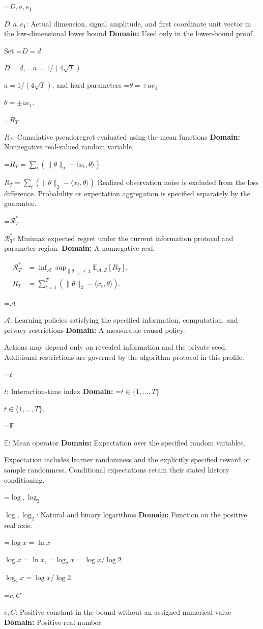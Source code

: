 \documentclass[10pt,a4paper]{article}
\newcommand{\AtlasMath}[1]{\par\begingroup\centering\setbox0=\hbox{$\displaystyle #1$}\ifdim\wd0>1.4\linewidth\typeout{ATLAS WIDE FORMULA: \the\wd0}\fi\ifdim\wd0>\linewidth\resizebox{\linewidth}{!}{\box0}\else\box0\fi\par\endgroup}
\newcommand{\AtlasInlineMath}[1]{\begingroup\setbox0=\hbox{$#1$}\ifdim\wd0>.4\linewidth\endgroup\AtlasMath{#1}\else\endgroup$#1$\fi}
\begin{document}
\AtlasInlineMath{D,a,e_1}: Actual dimension, signal amplitude, and first coordinate unit vector in the low-dimensional lower bound \textbf{Domain:} Used only in the lower-bound proof.

Set \AtlasInlineMath{D=d}, \AtlasInlineMath{a=1/(4\sqrt T)}, and hard parameters \AtlasInlineMath{\theta=\pm ae_1}.

\AtlasInlineMath{R_T}: Cumulative pseudoregret evaluated using the mean functions \textbf{Domain:} Nonnegative real-valued random variable.

\AtlasInlineMath{R_T=\sum_t(\|\theta\|_2-\langle x_t,\theta\rangle)} Realized observation noise is excluded from the loss difference. Probability or expectation aggregation is specified separately by the guarantee.

\AtlasInlineMath{\mathcal R_T^*}: Minimax expected regret under the current information protocol and parameter region. \textbf{Domain:} A nonnegative real.


\AtlasMath{\begin{aligned}\mathcal R_T^*&=\inf_{\mathcal A}\sup_{\|\theta\|_2\le1}\mathbb E_{\mathcal A,Z}[R_T],\\ R_T&=\sum_{t=1}^T(\|\theta\|_2-\langle x_t,\theta\rangle).\end{aligned}}


\AtlasInlineMath{\mathcal A}: Learning policies satisfying the specified information, computation, and privacy restrictions \textbf{Domain:} A measurable causal policy.

Actions may depend only on revealed information and the private seed. Additional restrictions are governed by the algorithm protocol in this profile.

\AtlasInlineMath{t}: Interaction-time index \textbf{Domain:} \AtlasInlineMath{t\in\{1,\ldots,T\}}.

\AtlasInlineMath{\mathbb E}: Mean operator \textbf{Domain:} Expectation over the specified random variables.

Expectation includes learner randomness and the explicitly specified reward or sample randomness. Conditional expectations retain their stated history conditioning.

\AtlasInlineMath{\log,\log_2}: Natural and binary logarithms \textbf{Domain:} Function on the positive real axis.

\AtlasInlineMath{\log x=\ln x}, \AtlasInlineMath{\log_2x=\log x/\log2}.

\AtlasInlineMath{c,C}: Positive constant in the bound without an assigned numerical value \textbf{Domain:} Positive real number.
\end{document}
